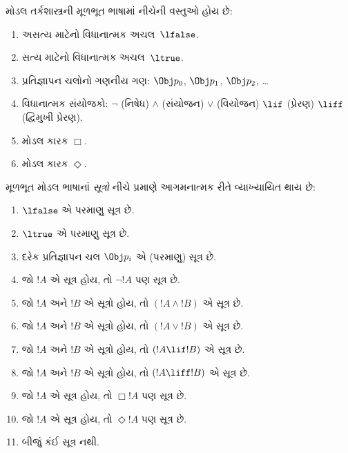 \begingroup
\makeatletter{}\makeatother


\label{guunit:OLP-0410}


\begin{defn}
મોડલ તર્કશાસ્ત્રની મૂળભૂત ભાષામાં નીચેની વસ્તુઓ હોય છે:
\begin{enumerate}
  \item અસત્ય માટેનો વિધાનાત્મક અચલ~$\lfalse$.
  \item સત્ય માટેનો વિધાનાત્મક અચલ~$\ltrue$.
  \item પ્રતિજ્ઞાપન ચલોનો ગણનીય ગણ: $\Obj
    p_0$, $\Obj p_1$, $\Obj p_2$, \dots
  \item વિધાનાત્મક સંયોજકો: \startycommalist
  \ycomma $\lnot$ (નિષેધ)%
  \ycomma $\land$ (સંયોજન)%
  \ycomma $\lor$ (વિયોજન)%
  \ycomma $\lif$ (પ્રેરણ)%
  \ycomma $\liff$ (દ્વિમુખી પ્રેરણ).
  \item મોડલ કારક $\Box$.
  \item મોડલ કારક $\Diamond$.
\end{enumerate}
\end{defn}

\begin{defn}
મૂળભૂત મોડલ ભાષાનાં \emph{સૂત્રો} નીચે પ્રમાણે
આગમનાત્મક રીતે વ્યાખ્યાયિત થાય છે:
\begin{enumerate}
\item $\lfalse$ એ પરમાણુ સૂત્ર છે.

\item $\ltrue$ એ પરમાણુ સૂત્ર છે.

\item દરેક પ્રતિજ્ઞાપન ચલ $\Obj p_i$ એ (પરમાણુ) સૂત્ર છે.

\item જો $!A$ એ સૂત્ર હોય, તો $\lnot !A$ પણ
  સૂત્ર છે.

\item જો $!A$ અને $!B$ એ સૂત્રો હોય, તો $(!A \land
  !B)$ એ સૂત્ર છે.

\item જો $!A$ અને $!B$ એ સૂત્રો હોય, તો $(!A \lor !B)$
  એ સૂત્ર છે.

\item જો $!A$ અને $!B$ એ સૂત્રો હોય, તો $(!A \lif !B)$
  એ સૂત્ર છે.

\item જો $!A$ અને $!B$ એ સૂત્રો હોય, તો $(!A \liff !B)$
  એ સૂત્ર છે.

\item જો $!A$ એ સૂત્ર હોય, તો $\Box !A$ પણ
  સૂત્ર છે.

\item જો $!A$ એ સૂત્ર હોય, તો $\Diamond !A$ પણ
  સૂત્ર છે.

\item બીજું કંઈ સૂત્ર નથી.
\end{enumerate}
\end{defn}


